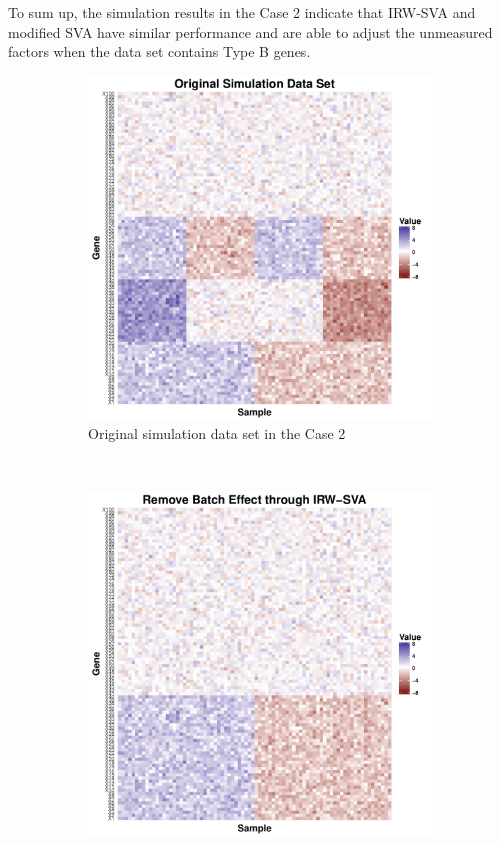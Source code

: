 \documentclass[11pt]{article}
\begin{document}
To sum up, the simulation results in the Case 2 indicate that IRW-SVA and modified SVA have similar performance and are able to adjust the unmeasured factors when the data set contains Type B genes.

\begin{figure}[h!]
    \centering
    \begin{subfigure}[b]{0.31\textwidth}
        \centering
        \includegraphics[width = \textwidth]{figures/simulate2.pdf}
        \caption{Original simulation data set in the Case 2}
        \label{fig:data2}
    \end{subfigure}%
~
    \begin{subfigure}[b]{0.31\textwidth}
        \centering
        \includegraphics[width = \textwidth]{figures/sva2.pdf}

\end{subfigure}
\end{figure}
\end{document}
